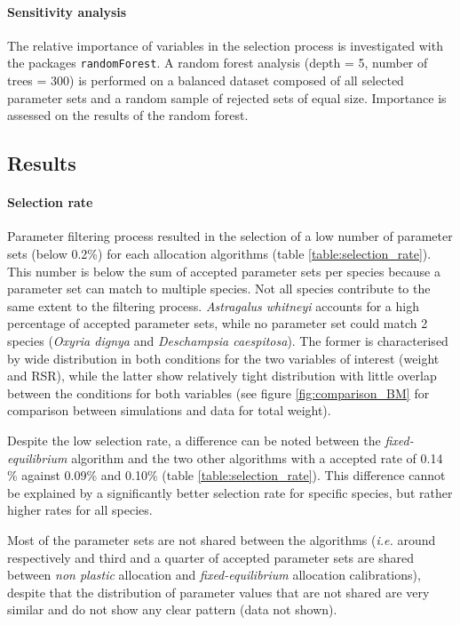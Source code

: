 \paragraph{Sensitivity analysis}
The relative importance of variables in the selection process is investigated with the packages \texttt{randomForest}. A random forest analysis (depth = 5, number of trees = 300) is performed on a balanced dataset composed of all selected parameter sets and a random sample of rejected sets of equal size. Importance is assessed on the results of the random forest.

\subsection{Results}

\paragraph{Selection rate}
Parameter filtering process resulted in the selection of a low number of parameter sets (below 0.2\%) for each allocation algorithms (table \ref{table:selection_rate}). This number is below the sum of accepted parameter sets per species because a parameter set can match to multiple species. Not all species contribute to the same extent to the filtering process. \textit{Astragalus whitneyi} accounts for a high percentage of accepted parameter sets, while no parameter set could match 2 species (\textit{Oxyria dignya} and \textit{Deschampsia caespitosa}). The former is characterised by wide distribution in both conditions for the two variables of interest (weight and RSR), while the latter show relatively tight distribution with little overlap between the conditions for both variables (see figure \ref{fig:comparison_BM} for comparison between simulations and data for total weight).


Despite the low selection rate, a difference can be noted between the \textit{fixed-equilibrium} algorithm and the two other algorithms with a accepted rate of 0.14 \% against 0.09\% and 0.10\% (table \ref{table:selection_rate}). This difference cannot be explained by a significantly better selection rate for specific species, but rather higher rates for all species.

Most of the parameter sets are not shared between the algorithms (\textit{i.e.} around respectively and third and a quarter of accepted parameter sets are shared between \textit{non plastic} allocation and \textit{fixed-equilibrium} allocation calibrations), despite that the distribution of parameter values that are not shared are very similar and do not show any clear pattern (data not shown).

